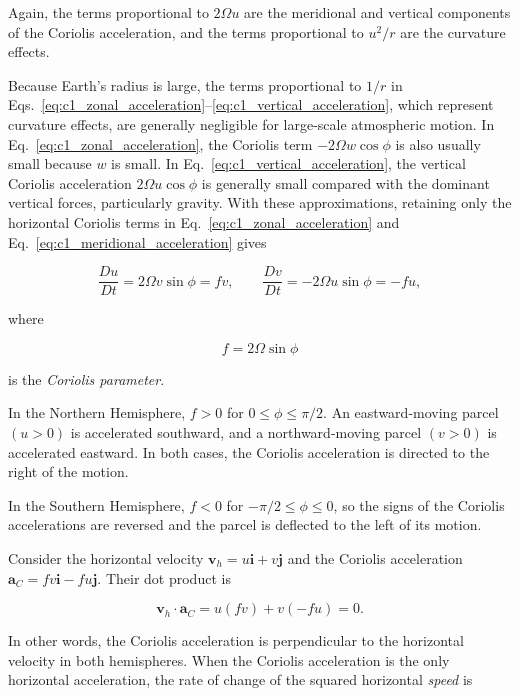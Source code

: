 \documentclass[10pt,twocolumn]{memoir}
\begin{document}
Again, the terms proportional to $2\Omega u$ are the meridional and vertical components of the Coriolis acceleration, and the terms proportional to $u^2/r$ are the curvature effects.

Because Earth's radius is large, the terms proportional to $1/r$ in Eqs.~\ref{eq:c1_zonal_acceleration}--\ref{eq:c1_vertical_acceleration}, which represent curvature effects, are generally negligible for large-scale atmospheric motion. In Eq.~\ref{eq:c1_zonal_acceleration}, the Coriolis term $-2\Omega w\cos\phi$ is also usually small because $w$ is small. In Eq.~\ref{eq:c1_vertical_acceleration}, the vertical Coriolis acceleration $2\Omega u\cos\phi$ is generally small compared with the dominant vertical forces, particularly gravity. With these approximations, retaining only the horizontal Coriolis terms in Eq.~\ref{eq:c1_zonal_acceleration} and Eq.~\ref{eq:c1_meridional_acceleration} gives

\begin{equation}
    \frac{D u}{D t} = 2\Omega v\sin\phi = fv, \qquad
    \frac{D v}{D t} = -2\Omega u\sin\phi = -fu,
\label{eq:c1_horizontal_coriolis}
\end{equation}

where

\begin{equation}
    f = 2\Omega\sin\phi
\end{equation}

is the \textit{Coriolis parameter}.

In the Northern Hemisphere, $f>0$ for $0\leq\phi\leq\pi/2$. An eastward-moving parcel $(u>0)$ is accelerated southward, and a northward-moving parcel $(v>0)$ is accelerated eastward. In both cases, the Coriolis acceleration is directed to the right of the motion.

In the Southern Hemisphere, $f<0$ for $-\pi/2\leq\phi\leq0$, so the signs of the Coriolis accelerations are reversed and the parcel is deflected to the left of its motion.

Consider the horizontal velocity $\mathbf{v}_h=u\mathbf{i}+v\mathbf{j}$ and the Coriolis acceleration $\mathbf{a}_C=fv\mathbf{i}-fu\mathbf{j}$. Their dot product is

\begin{equation}
    \mathbf{v}_h\cdot\mathbf{a}_C = u(fv)+v(-fu)=0.
\end{equation}

In other words, the Coriolis acceleration is perpendicular to the horizontal velocity in both hemispheres. When the Coriolis acceleration is the only horizontal acceleration, the rate of change of the squared horizontal \textit{speed} is
\end{document}
